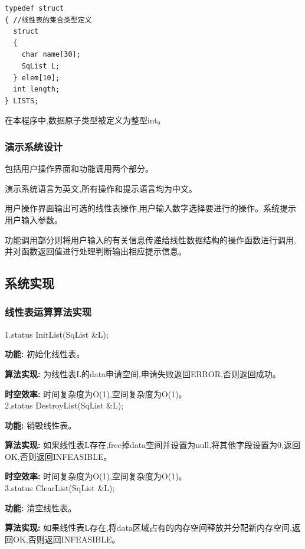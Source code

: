 \documentclass[supercite]{Experimental_Report}
\theoremstyle{definition}
\begin{document}
\begin{lstlisting}
typedef struct
{ //线性表的集合类型定义
  struct
  {
    char name[30];
    SqList L;
  } elem[10];
  int length;
} LISTS;

\end{lstlisting}

在本程序中,数据原子类型被定义为整型int。

\subsubsection{演示系统设计}

包括用户操作界面和功能调用两个部分。

演示系统语言为英文,所有操作和提示语言均为中文。

用户操作界面输出可选的线性表操作,用户输入数字选择要进行的操作。系统提示用户输入参数。

功能调用部分则将用户输入的有关信息传递给线性数据结构的操作函数进行调用,并对函数返回值进行处理判断输出相应提示信息。

\subsection{系统实现}

\subsubsection{线性表运算算法实现}

1.status InitList(SqList \&L);

\textbf{功能: }初始化线性表。

\textbf{算法实现: }为线性表L的data申请空间,申请失败返回ERROR,否则返回成功。

\textbf{时空效率: }时间复杂度为O(1),空间复杂度为O(1)。\\

2.status DestroyList(SqList \&L);

\textbf{功能: }销毁线性表。

\textbf{算法实现: }如果线性表L存在,free掉data空间并设置为null,将其他字段设置为0,返回OK,否则返回INFEASIBLE。

\textbf{时空效率: }时间复杂度为O(1),空间复杂度为O(1)。\\

3.status ClearList(SqList \&L);

\textbf{功能: }清空线性表。

\textbf{算法实现: }如果线性表L存在,将data区域占有的内存空间释放并分配新内存空间,返回OK,否则返回INFEASIBLE。
\end{document}
